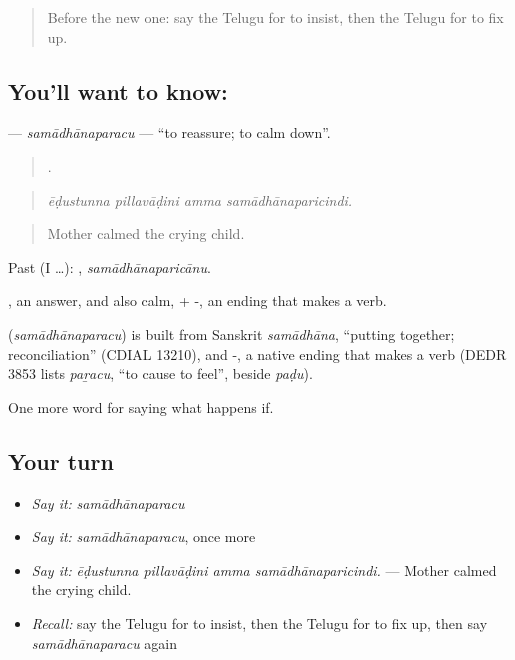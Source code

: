 \label{lesson:TE-C427-samadhanaparacu}



\begin{quote}
Before the new one: say the Telugu for to insist, then the Telugu for to fix up.
\end{quote}

\subsection*{You'll want to know: }
\textbf{} — \emph{samādhānaparacu} — \textquotedblleft{}to reassure; to calm down\textquotedblright{}.

\begin{quote}
   .
\end{quote}

\begin{quote}
\emph{ēḍustunna pillavāḍini amma samādhānaparicindi.}
\end{quote}

\begin{quote}
Mother calmed the crying child.
\end{quote}

Past (I …): , \emph{samādhānaparicānu}.

, an answer, and also calm, + -, an ending that makes a verb.

\begin{cousinweb}
\textbf{} (\emph{samādhānaparacu}) is built from Sanskrit \emph{samādhāna}, \textquotedblleft{}putting together; reconciliation\textquotedblright{} (CDIAL 13210), and -, a native ending that makes a verb (DEDR 3853 lists \emph{paṟacu}, \textquotedblleft{}to cause to feel\textquotedblright{}, beside \emph{paḍu}).
\end{cousinweb}

\begin{grammarlens}[title={What you've built}]
One more word for saying what happens if.
\end{grammarlens}

\subsection*{Your turn}
\begin{itemize}
\raggedright
  \item \emph{Say it:} \emph{samādhānaparacu}
  \item \emph{Say it:} \emph{samādhānaparacu}, once more
  \item \emph{Say it:} \emph{ēḍustunna pillavāḍini amma samādhānaparicindi.} — Mother calmed the crying child.
  \item \emph{Recall:} say the Telugu for to insist, then the Telugu for to fix up, then say \emph{samādhānaparacu} again
\end{itemize}

